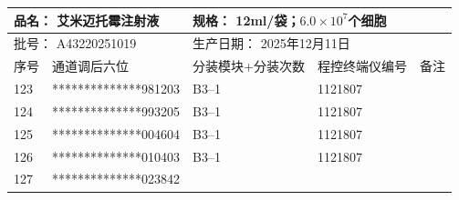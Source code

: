 \documentclass[UTF8,10pt,a4paper,fontset=fandol]{ctexart}
\newcommand{\fieldvalue}[1]{#1}
\begin{document}
\begin{center}
\scriptsize
\begin{tabular}{|p{1.0cm}|p{3.8cm}|p{2.3cm}|p{2.8cm}|p{2.2cm}|}
\hline
\multicolumn{2}{|l|}{品名：%
\fieldvalue{艾米迈托霉注射液}} &
\multicolumn{2}{l|}{规格：%
\fieldvalue{12ml/袋；$6.0\times10^{7}$个细胞}} &
\\ \hline
\multicolumn{2}{|l|}{批号：%
\fieldvalue{A43220251019}} &
\multicolumn{2}{l|}{生产日期：%
\fieldvalue{2025年12月11日}} &
\\ \hline
序号 & 通道调后六位 & 分装模块+分装次数 & 程控终端仪编号 & 备注 \\ \hline
\fieldvalue{123} &
\fieldvalue{**************981203} &
\fieldvalue{B3--1} &
\fieldvalue{1121807} & \\ \hline
\fieldvalue{124} &
\fieldvalue{**************993205} &
\fieldvalue{B3--1} &
\fieldvalue{1121807} & \\ \hline
\fieldvalue{125} &
\fieldvalue{**************004604} &
\fieldvalue{B3--1} &
\fieldvalue{1121807} & \\ \hline
\fieldvalue{126} &
\fieldvalue{**************010403} &
\fieldvalue{B3--1} &
\fieldvalue{1121807} & \\ \hline
\fieldvalue{127} &
\fieldvalue{**************023842} &

\end{tabular}
\end{center}
\end{document}
